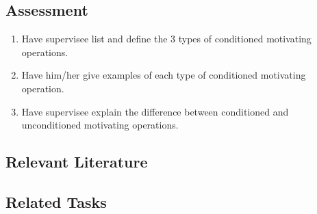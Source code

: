 \subsection{Assessment}
\begin{enumerate}
\item Have supervisee list and define the 3 types of conditioned motivating operations. 
\item Have him/her give examples of each type of conditioned motivating operation.
\item Have supervisee explain the difference between conditioned and unconditioned motivating operations.
%
\end{enumerate}
%
\subsection{Relevant Literature}
\begin{refsection}
\nocite{test,alang2017police,clayton2018black}
\printbibliography[heading=none]
\end{refsection}
%
\subsection{Related Tasks}
\fourdOne{}\\
\foureOne{}\\
\fourFKThirteen{}\\
\fourFKFourteen{}\\
\fourFKFifteen{}\\
\fourFKSixteen{}\\
\fourFKEighteen{}\\
\fourFKTwenty{}\\
\fourFKTwentySeven{}\\
\fourFKTwentyNine{}\\
\fourFKThirty{}\\
%
%
%
%
%
%
%
%
